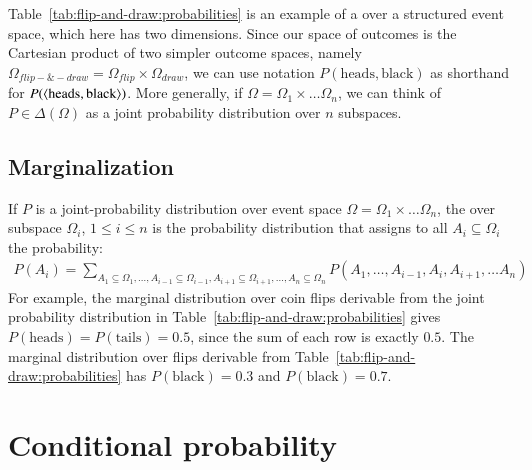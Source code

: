 \documentclass[nobib,nofonts]{tufte-handout}
\begin{document}
Table~\ref{tab:flip-and-draw:probabilities} is an example of a  over a structured event space, which here has two dimensions. Since
our space of outcomes is the Cartesian product of two simpler outcome spaces, namely
$\Omega_{flip-\&-draw} = \Omega_{flip} \times \Omega_{draw}$, we can use notation
$P(\text{heads}, \text{black})$ as shorthand for $P(\left \langle \text{heads}, \text{black}\right\rangle)$. More
generally, if $\Omega = \Omega_1 \times \dots \Omega_n$, we can think of $P \in \Delta(\Omega)$
as a joint probability distribution over $n$ subspaces.

\subsection{Marginalization}

If $P$ is a joint-probability distribution over event space $\Omega = \Omega_1 \times \dots
\Omega_n$, the  over subspace  $\Omega_i$, $1 \le
i \le n$ is the probability distribution that assigns to all $A_i \subseteq \Omega_i$ the probability:
\begin{align*}
  P(A_i) = \sum_{A_1 \subseteq \Omega_{1}, \dots , A_{i-1} \subseteq \Omega_{i-1}, A_{i+1} \subseteq \Omega_{i+1}, \dots, A_n \subseteq
    \Omega_n} P(A_1, \dots, A_{i-1}, A_{i}, A_{i+1}, \dots A_n)
\end{align*}
For example, the marginal distribution over coin flips derivable from the joint probability
distribution in Table~\ref{tab:flip-and-draw:probabilities} gives $P(\text{heads}) = P(\text{tails}) =
0.5$, since the sum of each row is exactly $0.5$. The marginal distribution over flips
derivable from Table~\ref{tab:flip-and-draw:probabilities} has $P(\text{black}) = 0.3$ and
$P(\text{black}) = 0.7$.

\section{Conditional probability}
\end{document}
